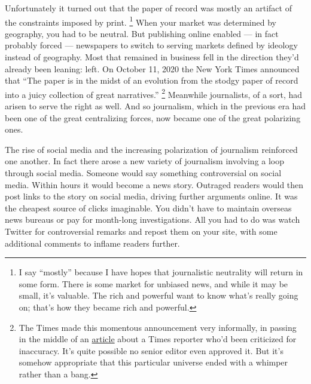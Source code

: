 Unfortunately it turned out that the paper of record was mostly an
artifact of the constraints imposed by print. \footnote{I say ``mostly'' because I have hopes that journalistic
neutrality will return in some form. There is some market for unbiased
news, and while it may be small, it's valuable. The rich and powerful
want to know what's really going on; that's how they became rich and
powerful.}
When your market was determined by geography, you had to be neutral. But
publishing online enabled --- in fact probably forced --- newspapers to
switch to serving markets defined by ideology instead of geography. Most
that remained in business fell in the direction they'd already been
leaning: left. On October 11, 2020 the New York Times announced that
``The paper is in the midst of an evolution from the stodgy paper of
record into a juicy collection of great narratives.''
\footnote{The Times made this momentous announcement very informally, in
passing in the middle of an
\href{https://www.nytimes.com/2020/10/11/business/media/new-york-times-rukmini-callimachi-caliphate.html}{article}
about a Times reporter who'd been criticized for inaccuracy. It's quite
possible no senior editor even approved it. But it's somehow appropriate
that this particular universe ended with a whimper rather than a bang.} Meanwhile journalists, of a sort, had arisen to
serve the right as well. And so journalism, which in the previous era
had been one of the great centralizing forces, now became one of the
great polarizing ones.

The rise of social media and the increasing polarization of journalism
reinforced one another. In fact there arose a new variety of journalism
involving a loop through social media. Someone would say something
controversial on social media. Within hours it would become a news
story. Outraged readers would then post links to the story on social
media, driving further arguments online. It was the cheapest source of
clicks imaginable. You didn't have to maintain overseas news bureaus or
pay for month-long investigations. All you had to do was watch Twitter
for controversial remarks and repost them on your site, with some
additional comments to inflame readers further.

